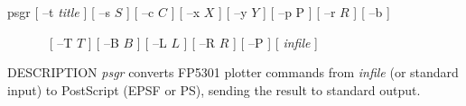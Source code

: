 % 
% 
% 
% 
%                                                                        
%
\hypertarget{psgr}{}

\begin{synopsis}
 \item[psgr] [ --t {\em title} ] [ --s $S$ ] [ --c $C$ ] [ --x $X$ ]
[ --y $Y$ ] [ --p P ] [ --r $R$ ] [ --b ] 
\item[\ ~~~~~][ --T $T$ ] [ --B $B$ ]
[ --L $L$ ] [ --R $R$ ] [ --P ] [ {\em infile} ]
\end{synopsis}

\begin{qsection}{DESCRIPTION}
{\em psgr} converts FP5301 plotter commands 
from {\em infile} (or standard input) to PostScript (EPSF or PS), 
sending the result to standard output.
\end{qsection}

